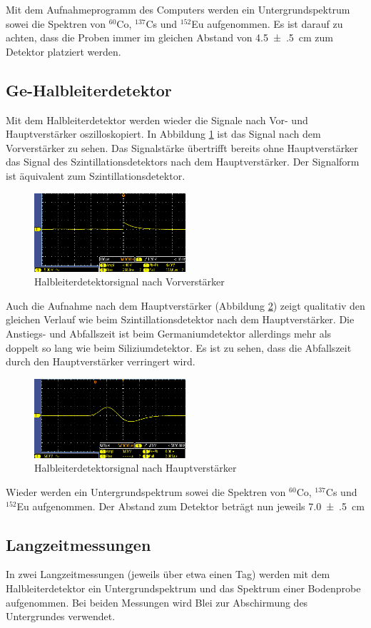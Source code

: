 Mit dem Aufnahmeprogramm des Computers werden ein Untergrundspektrum sowei die Spektren von $^{60}$Co, $^{137}$Cs und $^{152}$Eu aufgenommen. Es ist darauf zu achten, dass die Proben immer im gleichen Abstand von \SI[separate-uncertainty = true]{4.5(5)}{\centi\meter} zum Detektor platziert werden.

\subsection{Ge-Halbleiterdetektor}
Mit dem Halbleiterdetektor werden wieder die Signale nach Vor- und Hauptverstärker oszilloskopiert. In Abbildung \ref{fig:ge_nach_vorv} ist das Signal nach dem Vorverstärker zu sehen. Das Signalstärke übertrifft bereits ohne Hauptverstärker das Signal des Szintillationsdetektors nach dem Hauptverstärker.
Der Signalform ist äquivalent zum Szintillationsdetektor. 
\begin{figure}[h]
  \centering
  \includegraphics[width=0.5\textwidth]{data/raw/ge_nach_vorv.png}
  \caption{Halbleiterdetektorsignal nach Vorverstärker}
  \label{fig:ge_nach_vorv}
\end{figure}

Auch die Aufnahme nach dem Hauptverstärker (Abbildung \ref{fig:ge_nach_haupt}) zeigt qualitativ den gleichen Verlauf wie beim Szintillationsdetektor nach dem Hauptverstärker. Die Anstiegs- und Abfallszeit ist beim Germaniumdetektor allerdings mehr als doppelt so lang wie beim Siliziumdetektor. Es ist zu sehen, dass die Abfallszeit durch den Hauptverstärker verringert wird.
\begin{figure}[h]
  \centering
  \includegraphics[width=0.5\textwidth]{data/raw/ge_nach_haupt.png}
  \caption{Halbleiterdetektorsignal nach Hauptverstärker}
  \label{fig:ge_nach_haupt}
\end{figure}

Wieder werden ein Untergrundspektrum sowei die Spektren von $^{60}$Co, $^{137}$Cs und $^{152}$Eu aufgenommen. Der Abstand zum Detektor beträgt nun jeweils \SI[separate-uncertainty = true]{7.0(5)}{\centi\meter}

\subsection{Langzeitmessungen}
In zwei Langzeitmessungen (jeweils über etwa einen Tag) werden mit dem Halbleiterdetektor ein Untergrundspektrum und das Spektrum einer Bodenprobe aufgenommen. Bei beiden Messungen wird Blei zur Abschirmung des Untergrundes verwendet.

